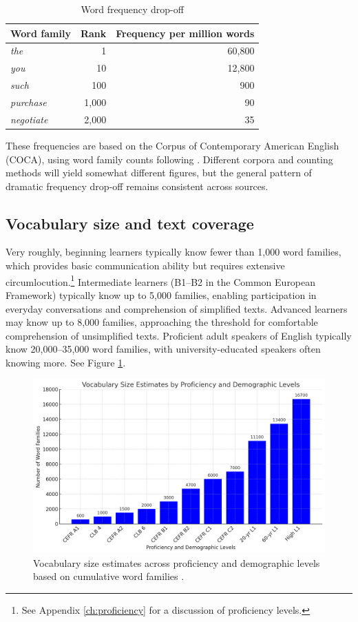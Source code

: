 \begin{table}[ht]
\centering
\caption{Word frequency drop-off}
\label{tab:word-frequency}
\begin{tabular}{lrr}
\toprule
\textbf{Word family} & \textbf{Rank} & \textbf{Frequency per million words} \\
\midrule
\textit{the} & 1 & 60,800 \\
\textit{you} & 10 & 12,800 \\
\textit{such} & 100 & 900 \\
\textit{purchase} & 1,000 & 90 \\
\textit{negotiate} & 2,000 & 35 \\
\bottomrule
\end{tabular}
\end{table}
These frequencies are based on the Corpus of Contemporary American English (COCA), using word family counts following \citet{nation2013}. Different corpora and counting methods will yield somewhat different figures, but the general pattern of dramatic frequency drop-off remains consistent across sources.

\subsection{Vocabulary size and text coverage} \label{sec:vocab-size-coverage}

Very roughly, beginning learners typically know fewer than 1,000 word families, which provides basic communication ability but requires extensive circumlocution.\footnote{See Appendix \ref{ch:proficiency} for a discussion of proficiency levels.} Intermediate learners (B1--B2 in the Common European Framework) typically know up to 5,000 families, enabling participation in everyday conversations and comprehension of simplified texts. Advanced learners may know up to 8,000 families, approaching the threshold for comfortable comprehension of unsimplified texts. Proficient adult speakers of English typically know 20,000--35,000 word families, with university-educated speakers often knowing more. See Figure \ref{fig:voc-size-est}.

\begin{figure}
   \centering
   \includegraphics[width=0.8\linewidth]{figures/vocab-size-est.png}
   \caption{Vocabulary size estimates across proficiency and demographic levels based on cumulative word families \citep{brysbaert2016, capel2010, capel2012}.}
   \label{fig:voc-size-est}
\end{figure}

